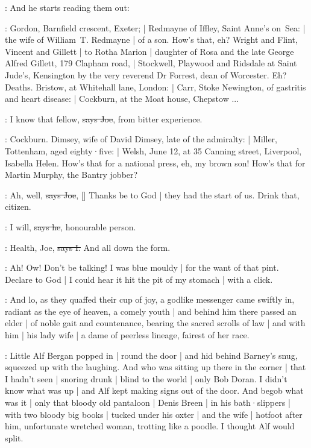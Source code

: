 \Nq:
And he starts reading them out:

\citizen:
Gordon,
Barnfield crescent,
Exeter; |
Redmayne of Iffley,
Saint Anne's on~Sea: |
the wife of William~T. Redmayne |
of a son.
How's that,
eh?
Wright and Flint,
Vincent and Gillett |
to Rotha Marion |
daughter of Rosa and the late George Alfred Gillett,
179 Clapham road, |
Stockwell, Playwood and Ridsdale at Saint Jude's,
Kensington by the very reverend Dr Forrest,
dean of Worcester.
Eh?
Deaths.
Bristow,
at Whitehall lane,
London: |
Carr,
Stoke Newington,
of gastritis and heart disease: |
Cockburn,
at the Moat house,
Chepstow ...

\joe:
I know that fellow,
\sout{says Joe},
from bitter experience.

\citizen:
Cockburn.
Dimsey,
wife of David Dimsey,
late of the admiralty: |
Miller,
Tottenham,
aged eighty·five: |
Welsh,
June 12,
at 35 Canning street,
Liverpool,
Isabella Helen.
How's that for a national press,
eh,
my brown son!
How's that for Martin Murphy,
the Bantry jobber?

\joe:
Ah, well,
\sout{says Joe},
[]
Thanks be to God |
they had the start of us.
Drink that,
citizen.

\citizen:
I will,
\sout{says he},
honourable person.

:
Health,
Joe,
\sout{says I.}
And all down the form.

\Nq:
Ah!
Ow!
Don't be talking!
I was blue mouldy |
for the want of that pint.
Declare to God |
I could hear it hit the pit of my stomach |
with a click.

:
And lo,
as they quaffed their cup of joy,
a godlike messenger came swiftly in,
radiant as the eye of heaven,
a comely youth |
and behind him
there passed an elder |
of noble gait and countenance,
bearing the sacred scrolls of law |
and with him |
his lady wife |
a dame of peerless lineage,
fairest of her race.

\Nq:
Little Alf Bergan popped in |
round the door |
and hid behind Barney's snug,
squeezed up with the laughing.
And who was sitting up there in the corner |
that I hadn't seen |
snoring drunk |
blind to the world |
only Bob Doran.
I didn't know what was up |
and Alf kept making signs out of the door.
And begob what was it |
only that bloody old pantaloon |
Denis Breen |
in his bath·slippers |
with two bloody big books |
tucked under his oxter |
and the wife |
hotfoot after him,
unfortunate wretched woman,
trotting like a poodle.
I thought Alf would split.

